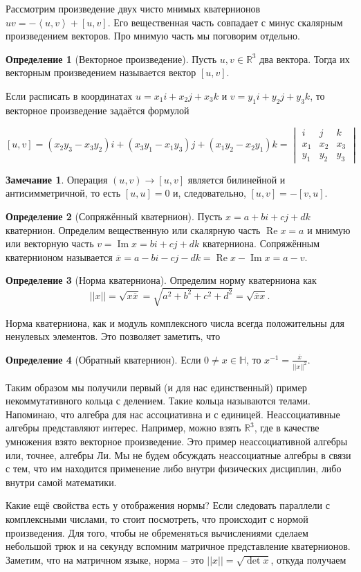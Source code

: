 \documentclass[10pt,a4paper,oneside]{book}
\theoremstyle{definition}
\newtheorem*{rem}{Замечание}
\newtheorem*{defn}{Определение}
\renewcommand{\Re}{\operatorname{Re}}
\newcommand{\mb}[1]{\mathbb{#1}}
\newcommand{\ovl}{\overline}
\renewcommand{\Im}{\operatorname{Im}}
\def\lan{\left\langle }
\def\ran{\right\rangle}
\def\dfn{\begin{defn}}
\def\edfn{\end{defn}}
\def\rm{\begin{rem}}
\def\erm{\end{rem}}
\begin{document}
Рассмотрим произведение двух чисто мнимых кватернионов $uv=-\lan u,v\ran+[u,v]$. Его вещественная часть совпадает с минус скалярным произведением векторов. Про мнимую часть мы поговорим отдельно.

\dfn[Векторное произведение] Пусть $u,v \in \mb R^3$ два вектора. Тогда их векторным произведением называется вектор $[u,v]$.
\edfn

Если расписать в координатах $u=x_1i+x_2j+x_3k$ и  $v=y_1i+y_2j+y_3k$, то векторное произведение задаётся формулой

$$[u,v]= (x_2y_3-x_3y_2)i + (x_3y_1-x_1y_3)j + (x_1y_2- x_2y_1)k= \begin{vmatrix} i& j&k \\ x_1 & x_2 & x_3 \\ y_1 & y_2 & y_3 \end{vmatrix} $$

\rm Операция $(u,v) \to [u,v]$ является билинейной и антисимметричной, то есть $[u,u]=0$ и, следовательно, $[u,v]=-[v,u]$.
\erm


\dfn[Сопряжённый кватернион] Пусть $x= a+bi+cj+dk$ кватернион. Определим вещественную или скалярную часть $\Re x=a$ и мнимую или векторную часть $v=\Im x= bi+cj+dk$ кватерниона. Сопряжённым кватернионом называется $\ovl{x}= a-bi-cj-dk= \Re x - \Im x =a-v$. 
\edfn

\dfn[Норма кватерниона] Определим норму кватерниона как $$||x||=\sqrt{x\ovl{x}}=\sqrt{ a^2+b^2+c^2+d^2}=\sqrt{\ovl{x}x}.$$
\edfn 


Норма кватерниона, как и модуль комплексного числа всегда положительны для ненулевых элементов. Это позволяет заметить, что

\dfn[Обратный кватернион] Если $0\neq x \in \mb H$, то $x^{-1}=\frac{\ovl{x}}{||x||^2}$. 
\edfn

Таким образом мы получили первый (и для нас единственный) пример некоммутативного кольца с делением. Такие кольца называются телами. Напоминаю, что алгебра для нас ассоциативна и с единицей. Неассоциативные алгебры представляют интерес. Например, можно взять $\mb R^3$, где в качестве умножения взято векторное произведение. Это пример неассоциативной алгебры или, точнее, алгебры Ли. Мы не будем обсуждать неассоциатные алгебры в связи с тем, что им находится применение либо внутри физических дисциплин, либо внутри самой математики. 

Какие ещё свойства есть у отображения нормы? Если следовать параллели с комплексными числами, то стоит посмотреть, что происходит с нормой произведения. Для того, чтобы не обременяться вычислениями сделаем небольшой трюк и на секунду вспомним матричное представление кватернионов. Заметим, что на матричном языке, норма -- это $||x||=\sqrt{\det x}$, откуда получаем
\end{document}
